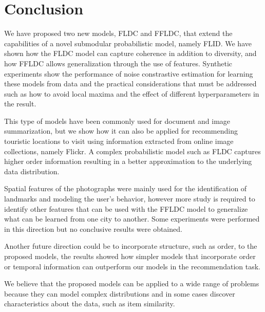 \chapter{Conclusion}
\label{sec:conclusion}

We have proposed two new models, FLDC and FFLDC, that extend the capabilities of a novel submodular probabilistic model, namely FLID. We have shown how the FLDC model can capture coherence in addition to diversity, and how FFLDC allows generalization through the use of features. Synthetic experiments show the performance of noise constrastive estimation for learning these models from data and the practical considerations that must be addressed such as how to avoid local maxima and the effect of different hyperparameters in the result.

This type of models have been commonly used for document and image summarization, but we show how it can also be applied for recommending touristic locations to visit using information extracted from online image collections, namely Flickr. A complex probabilistic model such as FLDC captures higher order information resulting in a better approximation to the underlying data distribution.

Spatial features of the photographs were mainly used for the identification of landmarks and modeling the user's behavior, however more study is required to identify other features that can be used with the FFLDC model to generalize what can be learned from one city to another. Some experiments were performed in this direction but no conclusive results were obtained.

Another future direction could be to incorporate structure, such as order, to the proposed models, the results showed how simpler models that incorporate order or temporal information can outperform our models in the recommendation task.

We believe that the proposed models can be applied to a wide range of problems because they can model complex distributions and in some cases discover characteristics about the data, such as item similarity.